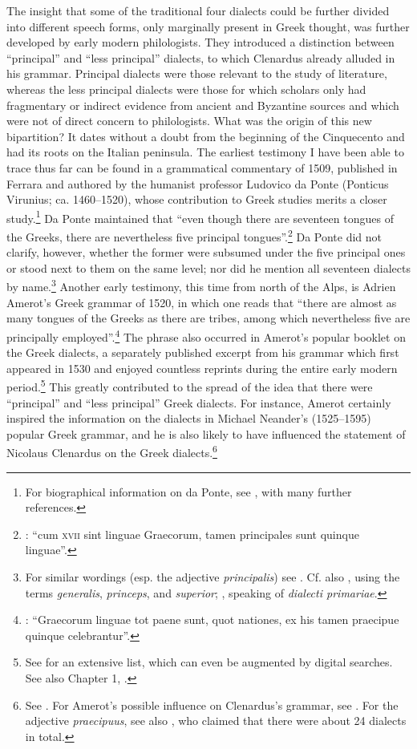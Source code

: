 The insight that some of the traditional four dialects could be further divided into different speech forms, only marginally present in Greek thought, was further developed by early modern philologists. They introduced a distinction between “principal” and “less principal” dialects, to which Clenardus already alluded in his grammar. Principal dialects were those relevant to the study of literature, whereas the less principal dialects were those for which scholars only had fragmentary or indirect evidence from ancient and Byzantine sources and which were not of direct concern to philologists. What was the origin of this new bipartition? It dates without a doubt from the beginning of the Cinquecento and had its roots on the Italian peninsula. The earliest testimony I have been able to trace thus far can be found in a grammatical commentary of 1509, published in Ferrara and authored by the humanist professor Ludovico da Ponte (Ponticus Virunius; ca. 1460–1520), whose contribution to Greek studies merits a closer study.\footnote{For biographical information on da Ponte, see \citet{Ricciardi1986}, with many further references.} Da Ponte maintained that “even though there are seventeen tongues of the Greeks, there are nevertheless five principal tongues”.\footnote{: “cum \textsc{xvii} sint linguae Graecorum, tamen principales sunt quinque linguae”.} Da Ponte did not clarify, however, whether the former were subsumed under the five principal ones or stood next to them on the same level; nor did he mention all seventeen dialects by name.\footnote{For similar wordings (esp. the adjective \textit{principalis}) see \citet[51--52]{Oecolampadius1518}. Cf. also \citet[12, a.3\textsc{\textsuperscript{v}}]{Canini1554, Canini1555}, using the terms \textit{generalis}, \textit{princeps}, and \textit{superior}; \citet[2]{Walper1589}, speaking of \textit{dialecti primariae}.} Another early testimony, this time from north of the Alps, is Adrien Amerot’s Greek grammar of 1520, in which one reads that “there are almost as many tongues of the Greeks as there are tribes, among which nevertheless five are principally employed”.\footnote{\citet[\textsc{q}.i\textsc{\textsuperscript{v}}]{Amerot1520}: “Graecorum linguae tot paene sunt, quot nationes, ex his tamen praecipue quinque celebrantur”.} The phrase also occurred in Amerot’s popular booklet on the Greek dialects, a separately published excerpt from his grammar which first appeared in 1530 and enjoyed countless reprints during the entire early modern period.\footnote{See \citet[5--19]{Hoven1985} for an extensive list, which can even be augmented by digital searches. See also Chapter 1, .} This greatly contributed to the spread of the idea that there were “principal” and “less principal” Greek dialects. For instance, Amerot certainly inspired the information on the dialects in Michael Neander’s (1525–1595) popular Greek grammar, and he is also likely to have influenced the statement of Nicolaus Clenardus on the Greek dialects.\footnote{See \citet[187]{Neander1553}. For Amerot’s possible influence on Clenardus’s grammar, see \citet{VanRooy2019}. For the adjective \textit{praecipuus}, see also \citet[42]{Mosellanus1527}, who claimed that there were about 24 dialects in total.}


